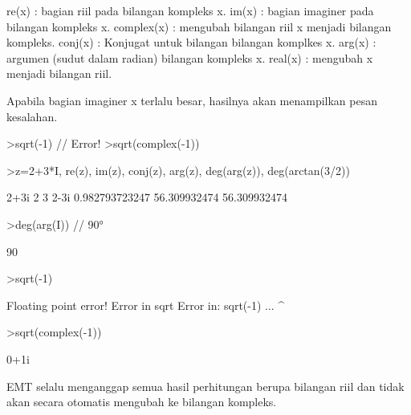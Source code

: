 \documentclass[a4paper,10pt]{article}
\begin{document}
\begin{eulernotebook}
\begin{eulercomment}
\begin{eulercomment}
\begin{eulercomment}
\end{eulercomment}
\begin{eulerttcomment}
  re(x) : bagian riil pada bilangan kompleks x.
  im(x) : bagian imaginer pada bilangan kompleks x.
  complex(x) : mengubah bilangan riil x menjadi bilangan kompleks.
  conj(x) : Konjugat untuk bilangan bilangan komplkes x.
  arg(x) : argumen (sudut dalam radian) bilangan kompleks x.
  real(x) : mengubah x menjadi bilangan riil.
\end{eulerttcomment}
\begin{eulercomment}

Apabila bagian imaginer x terlalu besar, hasilnya akan menampilkan pesan
kesalahan.

\end{eulercomment}
\begin{eulerttcomment}
  >sqrt(-1) // Error!
  >sqrt(complex(-1))
\end{eulerttcomment}
\begin{eulerprompt}
>z=2+3*I, re(z), im(z), conj(z), arg(z), deg(arg(z)), deg(arctan(3/2))
\end{eulerprompt}
\begin{euleroutput}
  2+3i
  2
  3
  2-3i
  0.982793723247
  56.309932474
  56.309932474
\end{euleroutput}
\begin{eulerprompt}
>deg(arg(I)) // 90°
\end{eulerprompt}
\begin{euleroutput}
  90
\end{euleroutput}
\begin{eulerprompt}
>sqrt(-1)
\end{eulerprompt}
\begin{euleroutput}
  Floating point error!
  Error in sqrt
  Error in:
  sqrt(-1) ...
          ^
\end{euleroutput}
\begin{eulerprompt}
>sqrt(complex(-1))
\end{eulerprompt}
\begin{euleroutput}
  0+1i
\end{euleroutput}
\begin{eulercomment}
EMT selalu menganggap semua hasil perhitungan berupa bilangan riil dan tidak
akan secara otomatis mengubah ke bilangan kompleks.


\end{eulercomment}
\end{eulercomment}
\end{eulercomment}
\end{eulernotebook}
\end{document}
